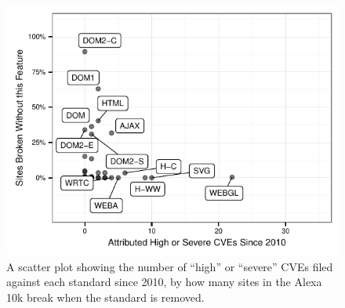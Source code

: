 \begin{figure}[t]
  \centering
  \includegraphics[width=.5\textwidth]{figures/cve_breakrate_severe.pdf}
  \caption{A scatter plot showing the number of ``high'' or ``severe'' CVEs filed against each standard since 2010, by how many sites in the Alexa 10k break when the standard is removed.}
  \label{fig:cve-breakrate-severe}
\end{figure}
